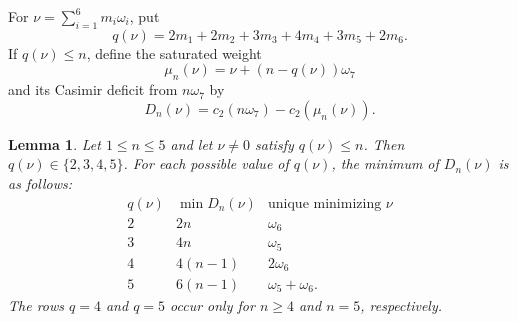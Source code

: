 \documentclass[11pt,reqno]{amsart}
\newtheorem{lemma}[theorem]{Lemma}
\theoremstyle{definition}
\theoremstyle{remark}
\begin{document}
For $\nu=\sum_{i=1}^{6}m_i\omega_i$, put
\begin{equation}
 q(\nu)=2m_1+2m_2+3m_3+4m_4+3m_5+2m_6.
 \label{e8:eq:E8-E7-nonomega7-level}
\end{equation}
If $q(\nu)\le n$, define the saturated weight
\begin{equation*}
 \mu_n(\nu)=\nu+(n-q(\nu))\omega_7
\end{equation*}
and its Casimir deficit from $n\omega_7$ by
\begin{equation*}
 D_n(\nu)
 =c_2(n\omega_7)-c_2(\mu_n(\nu)).
\end{equation*}

\begin{lemma}
\label{e8:lem:E8-E7-deficit-classification}
Let $1\le n\le5$ and let $\nu\ne0$ satisfy $q(\nu)\le n$.
Then $q(\nu)\in\{2,3,4,5\}$.  For each possible value of $q(\nu)$,
the minimum of $D_n(\nu)$ is as follows:
\begin{equation*}
\begin{array}{c|c|c}
q(\nu)&\min D_n(\nu)&\text{unique minimizing }\nu\\
\hline
2&2n&\omega_6\\
3&4n&\omega_5\\
4&4(n-1)&2\omega_6\\
5&6(n-1)&\omega_5+\omega_6.
\end{array}
\end{equation*}
The rows $q=4$ and $q=5$ occur only for $n\ge4$ and $n=5$,
respectively.
\end{lemma}
\end{document}
